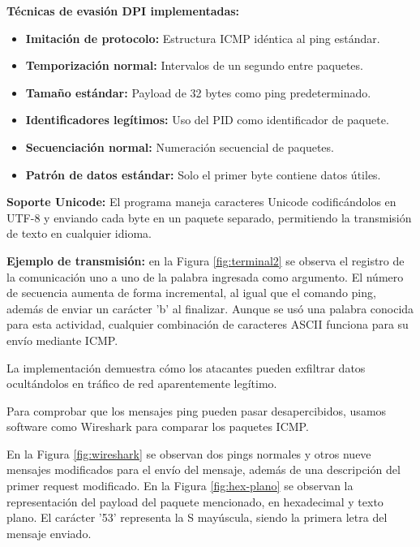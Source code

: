 \documentclass[letter,12pt]{article}
\begin{document}
\textbf{Técnicas de evasión DPI implementadas:}
\begin{itemize}
    \item \textbf{Imitación de protocolo:} Estructura ICMP idéntica al ping estándar.
    \item \textbf{Temporización normal:} Intervalos de un segundo entre paquetes.
    \item \textbf{Tamaño estándar:} Payload de 32 bytes como ping predeterminado.
    \item \textbf{Identificadores legítimos:} Uso del PID como identificador de paquete.
    \item \textbf{Secuenciación normal:} Numeración secuencial de paquetes.
    \item \textbf{Patrón de datos estándar:} Solo el primer byte contiene datos útiles.
\end{itemize}

\textbf{Soporte Unicode:}
El programa maneja caracteres Unicode codificándolos en UTF-8 y enviando cada byte en un paquete separado, permitiendo la transmisión de texto en cualquier idioma.

\textbf{Ejemplo de transmisión:} en la Figura \ref{fig:terminal2} se observa el registro de la comunicación uno a uno de la palabra ingresada como argumento. El número de secuencia aumenta de forma incremental, al igual que el comando ping, además de enviar un carácter 'b' al finalizar. Aunque se usó una palabra conocida para esta actividad, cualquier combinación de caracteres ASCII funciona para su envío mediante ICMP.

La implementación demuestra cómo los atacantes pueden exfiltrar datos ocultándolos en tráfico de red aparentemente legítimo.

Para comprobar que los mensajes ping pueden pasar desapercibidos, usamos software como Wireshark para comparar los paquetes ICMP.

En la Figura \ref{fig:wireshark} se observan dos pings normales y otros nueve mensajes modificados para el envío del mensaje, además de una descripción del primer request modificado.
En la Figura \ref{fig:hex-plano} se observan la representación del payload del paquete mencionado, en hexadecimal y texto plano. El carácter '53' representa la S mayúscula, siendo la primera letra del mensaje enviado.
\end{document}
